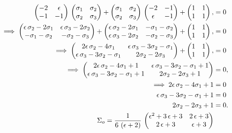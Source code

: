 \begin{align*}
    \begin{pmatrix}
        -2 & \epsilon \\
        -1 & -1
    \end{pmatrix}\,\begin{pmatrix} \sigma_{1} & \sigma_{2} \\ \sigma_{2} & \sigma_{3} \end{pmatrix} + \begin{pmatrix} \sigma_{1} & \sigma_{2} \\ \sigma_{2} & \sigma_{3} \end{pmatrix}\,\begin{pmatrix}
        -2 & -1 \\
        \epsilon & -1
    \end{pmatrix} + \begin{pmatrix}
        1 & 1 \\
        1 & 1
    \end{pmatrix}, &= 0\\
    \implies \begin{pmatrix}
        \epsilon\,\sigma_2 - 2\sigma_1 & \epsilon\,\sigma_3 - 2\sigma_2 \\
        -\sigma_1 - \sigma_2 & - \sigma_2 - \sigma_3
    \end{pmatrix} + \begin{pmatrix}
        \epsilon\,\sigma_2 - 2\sigma_1 & -\sigma_1 - \sigma_2 \\
        \epsilon\,\sigma_3 - 2\sigma_2 & - \sigma_2 - \sigma_3
    \end{pmatrix} + \begin{pmatrix}
        1 & 1 \\
        1 & 1
    \end{pmatrix}, &= 0\\
    \implies \begin{pmatrix}
        2\epsilon\,\sigma_2 - 4\sigma_1 & \epsilon\,\sigma_3 - 3\sigma_2 - \sigma_1 \\
        \epsilon\,\sigma_3 - 3\sigma_2 - \sigma_1 & 2\sigma_2 - 2\sigma_3
    \end{pmatrix} + \begin{pmatrix}
        1 & 1 \\
        1 & 1
    \end{pmatrix}, &= 0\\
    \implies \begin{pmatrix}
        2\epsilon\,\sigma_2 - 4\sigma_1 + 1 & \epsilon\,\sigma_3 - 3\sigma_2 - \sigma_1 + 1\\
        \epsilon\,\sigma_3 - 3\sigma_2 - \sigma_1 + 1 & 2\sigma_2 - 2\sigma_3 + 1
    \end{pmatrix}  &= 0,\\
    \implies 2\epsilon\,\sigma_2 - 4\sigma_1 + 1 &= 0 \\
    \epsilon\,\sigma_3 - 3\sigma_2 - \sigma_1 + 1 &= 0\\
    2\sigma_2 - 2\sigma_3 + 1 &= 0.\\
    \Sigma_o = \frac{1}{6\,\left(\epsilon + 2\right)}\,\begin{pmatrix}
        \epsilon^2 + 3\,\epsilon + 3 & 2\,\epsilon + 3  \\
        2\,\epsilon + 3 & \epsilon + 3
    \end{pmatrix}
\end{align*}
